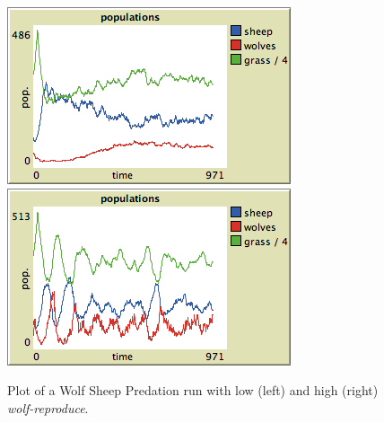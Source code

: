 \begin{figure}[ht]
\centering
\includegraphics[scale=.666667]{images/wolfsheep/wolfsex_low.png}
\includegraphics[scale=.666667]{images/wolfsheep/wolfsex_high.png}
\caption{Plot of a Wolf Sheep Predation run with low (left) and high (right) \textit{wolf-reproduce}.}
\label{fig:wsp_wolfsex}
\end{figure}


